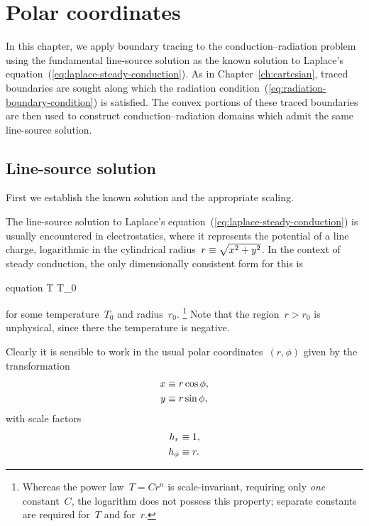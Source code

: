 \chapter{Polar coordinates}
\label{ch:polar}

In this chapter,
we apply boundary tracing to the conduction--radiation problem
using the fundamental line-source solution
as the known solution to
Laplace's equation~(\ref{eq:laplace-steady-conduction}).
As in Chapter~\ref{ch:cartesian},
traced boundaries are sought along which
the radiation condition~(\ref{eq:radiation-boundary-condition})
is satisfied.
The convex portions of these traced boundaries are then used
to construct conduction--radiation domains
which admit the same line-source solution.

\section{Line-source solution}
\label{sec:polar.line}

First we establish the known solution and the appropriate scaling.

The line-source solution
to Laplace's equation~(\ref{eq:laplace-steady-conduction})
is usually encountered in electrostatics,
where it represents the potential of a line charge,
logarithmic in the cylindrical radius~$r \equiv \sqrt{x^2 + y^2}$.
In the context of steady conduction,
the only dimensionally consistent form for this is
\begin{important}{equation}
  T \ideq T_0 \log {}
  \label{eq:line-laplace-solution}
\end{important}
for some temperature~$T_0$ and radius~$r_0$.%
\footnote{
  Whereas the power law~$T = C r^n$ is scale-invariant,
  requiring only \emph{one} constant~$C$,
  the logarithm does not possess this property;
  separate constants are required for~$T$ and for~$r$.
}
Note that the region~$r > r_0$ is unphysical,
since there the temperature is negative.

Clearly it is sensible to work in the usual polar coordinates~$(r, \phi)$
given by the transformation
\begin{align}
  x &\equiv r \cos\phi, \label{eq:x-transformation-polar} \\
  y &\equiv r \sin\phi, \label{eq:y-transformation-polar}
\end{align}
with scale factors
\begin{align}
  \scalefac[r] &\ideq 1, \label{eq:r-scale-factor-polar} \\
  \scalefac[\phi] &\ideq r. \label{eq:phi-scale-factor-polar}
\end{align}

